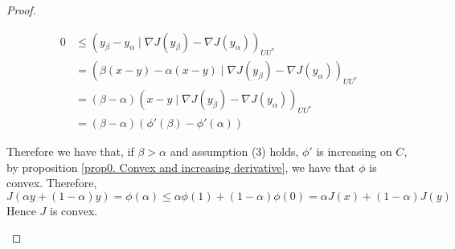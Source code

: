 \begin{proposition}
\begin{proof}
\begin{itemize}
		 \begin{align*}
		 0 &\leq (y_\beta - y_\alpha \mid \nabla J(y_\beta)-\nabla J(y_\alpha))_{UU^*}\\
		   &=(\beta (x-y) - \alpha(x-y) \mid \nabla J(y_\beta)-\nabla J(y_\alpha))_{UU^*} \\
	 	   &=(\beta-\alpha) (x-y \mid \nabla J(y_\beta)-\nabla J(y_\alpha))_{UU^*} \\
	 	   &= (\beta-\alpha) \left(\phi'(\beta)-\phi'(\alpha)\right)
		 \end{align*} 
		 
		 Therefore we have that, if $\beta > \alpha$ and assumption (3) holds, $\phi'$ is increasing on $C$, by proposition \eqref{prop0. Convex and increasing derivative}, we have that $\phi$ is convex. Therefore,
		 \[
		 J(\alpha y+(1-\alpha)y)=\phi(\alpha) \leq \alpha \phi(1)+(1-\alpha)\phi(0)=\alpha J(x) +(1-\alpha)J(y)
		 \]
		 Hence $J$ is convex.
		\end{itemize}
	 \end{proof}
\label{prop5. First derivative convex.}
\end{proposition}

